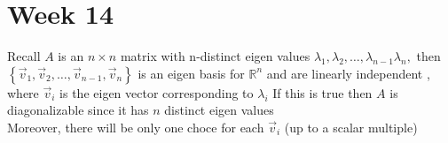 \documentclass[11pt]{book}
\begin{document}






\chapter{Week 14}%
\label{chp:week_14}

\begin{thm}\label{thm:forced_diagonalization}

Recall $A$ is an $n\times n$ matrix with n-distinct eigen values $\lambda _{1} , \lambda _{2} ,  \ldots,  \lambda _{n  - 1} \lambda _{n} , $ then $\left\{ \vec{v} _{1}, \vec{v} _{2},  \ldots,  \vec{v} _{n - 1}, \vec{v} _{n}   \right\} $ is an eigen basis for $\mathbb{R} ^{n} $ and are linearly independent , where $\vec{v} _{i} $ is the eigen vector corresponding to $\lambda _{i} $  
If this is true then $A$ is diagonalizable since it has $n$ distinct eigen values\\
Moreover, there will be only one choce for each $\vec{v} _{i} $ (up to a scalar multiple)      
\end{thm}
\end{document}

